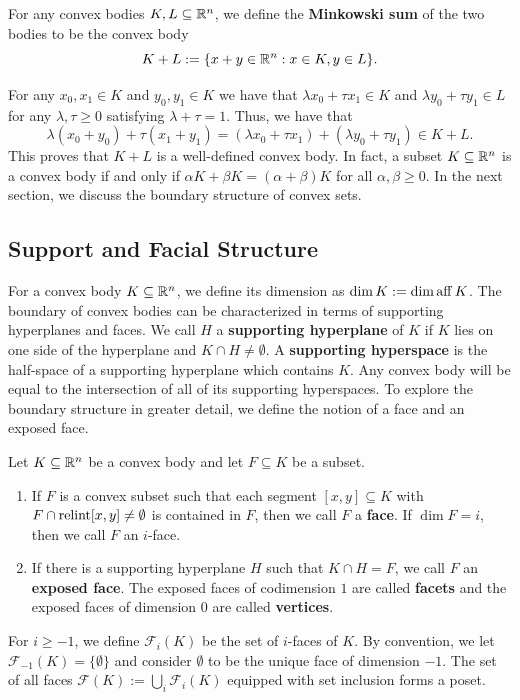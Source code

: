 \documentclass{puthesis-UG}
\begin{document}
\begin{defn}
	For any convex bodies $K, L \subseteq \mathbb{R}^n$, we define the \textbf{Minkowski sum} of the two bodies to be the convex body
	\[
		K + L := \{x + y \in \mathbb{R}^n : x \in K, y \in L\}.
	\]
\end{defn}

For any $x_0, x_1 \in K$ and $y_0, y_1 \in K$ we have that $\lambda x_0 + \tau x_1 \in K$ and $\lambda y_0 + \tau y_1 \in L$ for any $\lambda, \tau \geq 0$ satisfying $\lambda + \tau = 1$. Thus, we have that 
\[
	\lambda (x_0 + y_0) + \tau (x_1 + y_1) = (\lambda x_0 + \tau x_1) + (\lambda y_0 + \tau y_1) \in K + L.
\]
This proves that $K + L$ is a well-defined convex body. In fact, a subset $K \subseteq \mathbb{R}^n$ is a convex body if and only if $\alpha K + \beta K = (\alpha + \beta) K$ for all $\alpha, \beta \geq 0$. In the next section, we discuss the boundary structure of convex sets.  

\subsection{Support and Facial Structure}

For a convex body $K \subseteq \mathbb{R}^n$, we define its dimension as $\dim K := \dim \operatorname{aff} K$. The boundary of convex bodies can be characterized in terms of supporting hyperplanes and faces. We call $H$ a \textbf{supporting hyperplane} of $K$ if $K$ lies on one side of the hyperplane and $K \cap H \neq \emptyset$. A \textbf{supporting hyperspace} is the half-space of a supporting hyperplane which contains $K$. Any convex body will be equal to the intersection of all of its supporting hyperspaces. To explore the boundary structure in greater detail, we define the notion of a face and an exposed face. 
\begin{defn} \label{face-and-exposed-face}
	Let $K \subseteq \mathbb{R}^n$ be a convex body and let $F \subseteq K$ be a subset. 
	\begin{enumerate}[label = (\alph*)]
		\item If $F$ is a convex subset such that each segment $[x, y] \subseteq K$ with $F \cap \operatorname{relint} [x, y] \neq \emptyset$ is contained in $F$, then we call $F$ a \textbf{face}. If $\dim F = i$, then we call $F$ an $i$-face. 

		\item If there is a supporting hyperplane $H$ such that $K \cap H = F$, we call $F$ an \textbf{exposed face}. The exposed faces of codimension $1$ are called \textbf{facets} and the exposed faces of dimension $0$ are called \textbf{vertices}. 
	\end{enumerate}
	For $i \geq -1$, we define $\mathcal{F}_i(K)$ be the set of $i$-faces of $K$. By convention, we let $\mathcal{F}_{-1}(K) = \{\emptyset\}$ and consider $\emptyset$ to be the unique face of dimension $-1$. The set of all faces $\mathcal{F}(K) := \bigcup_i \mathcal{F}_i(K)$ equipped with set inclusion forms a poset. 
\end{defn}
\end{document}
